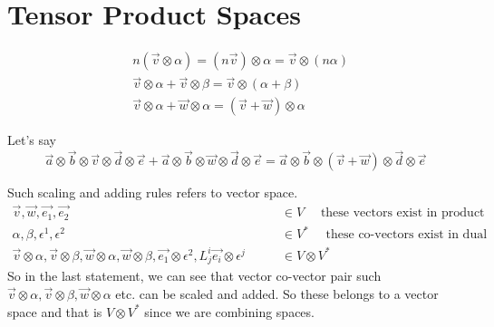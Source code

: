 \documentclass{article}
\begin{document}
	
	
	\section*{Tensor Product Spaces}
	\begin{tcolorbox}
		\begin{align*}
			& n(\overrightarrow{v}\otimes\alpha) = (n\overrightarrow{v})\otimes\alpha = \overrightarrow{v}\otimes(n\alpha)\\
			& \overrightarrow{v}\otimes\alpha + \overrightarrow{v}\otimes\beta = \overrightarrow{v}\otimes(\alpha + \beta)\\
			& \overrightarrow{v}\otimes\alpha + \overrightarrow{w}\otimes\alpha = (\overrightarrow{v}+\overrightarrow{w})\otimes\alpha
		\end{align*}
	\end{tcolorbox}
	
	Let's say 
	$$\overrightarrow{a}\otimes\overrightarrow{b}\otimes\overrightarrow{v}\otimes\overrightarrow{d}\otimes\overrightarrow{e} + \overrightarrow{a}\otimes\overrightarrow{b}\otimes\overrightarrow{w}\otimes\overrightarrow{d}\otimes\overrightarrow{e} = \overrightarrow{a}\otimes\overrightarrow{b}\otimes(\overrightarrow{v} + \overrightarrow{w})\otimes\overrightarrow{d}\otimes\overrightarrow{e}$$
	
	Such scaling and adding rules refers to vector space.
	\large
	\begin{align}
		\overrightarrow{v},\overrightarrow{w},\overrightarrow{e_{1}},\overrightarrow{e_{2}}\quad\quad &\in V \quad\text{ these vectors exist in product space V}\\
		\alpha,\beta,\epsilon^{1},\epsilon^{2}\quad\quad &\in V^{*}\quad \text{ these co-vectors exist in dual space}\\
		\overrightarrow{v}\otimes\alpha,\overrightarrow{v}\otimes\beta,\overrightarrow{w}\otimes\alpha,\overrightarrow{w}\otimes\beta,\overrightarrow{e_{1}}\otimes\epsilon^{2},L^{i}_{j}\overrightarrow{e_{i}}\otimes\epsilon^{j}\quad\quad &\in V\otimes V^{*}
	\end{align}
	\Large
	So in the last statement, we can see that vector co-vector pair such  $\overrightarrow{v}\otimes\alpha,\overrightarrow{v}\otimes\beta,\overrightarrow{w}\otimes\alpha$ etc. can be scaled and added. So these belongs to a vector space and that is $V\otimes V^{*}$ since we are combining spaces. 
\end{document}
